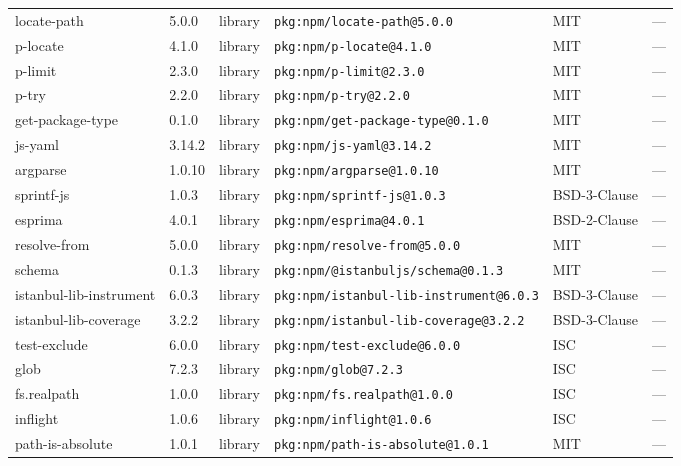 \documentclass[11pt,a4paper]{article}
\begin{document}
\begin{longtable}{|p{4cm}|p{2cm}|p{1.6cm}|p{5cm}|p{1.5cm}|p{3.5cm}|}
\raggedright locate-path & 5.0.0 & library & \small\texttt{pkg:npm/locate-path@5.0.0} & MIT & \small — \\
\raggedright p-locate & 4.1.0 & library & \small\texttt{pkg:npm/p-locate@4.1.0} & MIT & \small — \\
\raggedright p-limit & 2.3.0 & library & \small\texttt{pkg:npm/p-limit@2.3.0} & MIT & \small — \\
\raggedright p-try & 2.2.0 & library & \small\texttt{pkg:npm/p-try@2.2.0} & MIT & \small — \\
\raggedright get-package-type & 0.1.0 & library & \small\texttt{pkg:npm/get-package-type@0.1.0} & MIT & \small — \\
\raggedright js-yaml & 3.14.2 & library & \small\texttt{pkg:npm/js-yaml@3.14.2} & MIT & \small — \\
\raggedright argparse & 1.0.10 & library & \small\texttt{pkg:npm/argparse@1.0.10} & MIT & \small — \\
\raggedright sprintf-js & 1.0.3 & library & \small\texttt{pkg:npm/sprintf-js@1.0.3} & BSD-3-Clause & \small — \\
\raggedright esprima & 4.0.1 & library & \small\texttt{pkg:npm/esprima@4.0.1} & BSD-2-Clause & \small — \\
\raggedright resolve-from & 5.0.0 & library & \small\texttt{pkg:npm/resolve-from@5.0.0} & MIT & \small — \\
\raggedright schema & 0.1.3 & library & \small\texttt{pkg:npm/@istanbuljs/schema@0.1.3} & MIT & \small — \\
\raggedright istanbul-lib-instrument & 6.0.3 & library & \small\texttt{pkg:npm/istanbul-lib-instrument@6.0.3} & BSD-3-Clause & \small — \\
\raggedright istanbul-lib-coverage & 3.2.2 & library & \small\texttt{pkg:npm/istanbul-lib-coverage@3.2.2} & BSD-3-Clause & \small — \\
\raggedright test-exclude & 6.0.0 & library & \small\texttt{pkg:npm/test-exclude@6.0.0} & ISC & \small — \\
\raggedright glob & 7.2.3 & library & \small\texttt{pkg:npm/glob@7.2.3} & ISC & \small — \\
\raggedright fs.realpath & 1.0.0 & library & \small\texttt{pkg:npm/fs.realpath@1.0.0} & ISC & \small — \\
\raggedright inflight & 1.0.6 & library & \small\texttt{pkg:npm/inflight@1.0.6} & ISC & \small — \\
\raggedright path-is-absolute & 1.0.1 & library & \small\texttt{pkg:npm/path-is-absolute@1.0.1} & MIT & \small — \\

\end{longtable}
\end{document}
